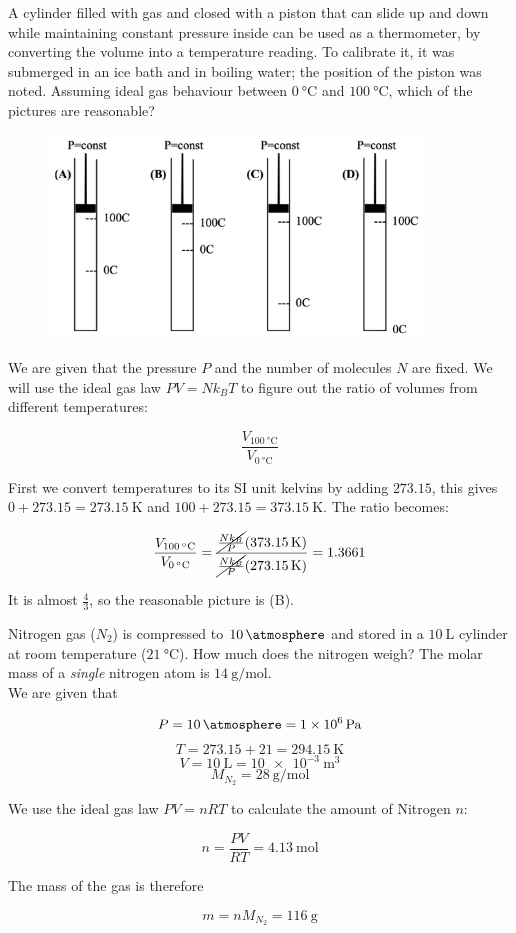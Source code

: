 \documentclass[12pt, a4paper]{article}
\newcounter{exa}
\begin{document}
\begin{texample}
A cylinder filled with gas and closed with a piston that can slide up and down while maintaining constant pressure inside can be used as a thermometer, by converting the volume into a temperature reading. To calibrate it, it was submerged in an ice bath and in boiling water; the position of the piston was 
noted. Assuming ideal gas behaviour between $\SI{0}{\celsius}$ and $\SI{100}{\celsius}$, which of the pictures are reasonable?

\begin{figure}[H]
\centering
\includegraphics[width=100mm]{18.png}
\end{figure}

We are given that the pressure $P$ and the number of molecules $N$ are fixed. We will use the ideal gas law $PV=Nk_B T$ to figure out the ratio of volumes from different temperatures:

$$\frac{V_{\SI{100}{\celsius}}}{V_{\SI{0}{\celsius}}}$$

First we convert temperatures to its SI unit kelvins by adding $273.15$, this gives $0+273.15=\SI{273.15}{\kelvin}$ and $100+273.15=\SI{373.15}{\kelvin}$. The ratio becomes:

$$\frac{V_{\SI{100}{\celsius}}}{V_{\SI{0}{\celsius}}}=\frac{\cancel{\frac{Nk_B}{P}} (\SI{373.15}{\kelvin})}{\cancel{\frac{Nk_B}{P}} (\SI{273.15}{\kelvin})}=1.3661$$

It is almost $\frac43$, so the reasonable picture is (B).
\end{texample}

\begin{texample}
Nitrogen gas ($N_2$) is compressed to $\SI{10}{\atmosphere}$ and stored in a $\SI{10}{\liter}$ cylinder at room temperature ($\SI{21}{\celsius}$). How much does the nitrogen weigh? The molar mass of a \textit{single} nitrogen atom is $\SI{14}{\gram\per\mole}$. \\

We are given that

$$P=\SI{10}{\atmosphere}=\SI{1e6}{\pascal}$$
$$T=273.15+21=\SI{294.15}{\kelvin}$$
$$V=\SI{10}{\liter}=\SI{10e-3}{\cubic\meter}$$
$$M_{N_2}=\SI{28}{\gram\per\mole}$$

We use the ideal gas law $PV=nRT$ to calculate the amount of Nitrogen $n$:

$$n=\frac{PV}{RT}=\SI{4.13}{\mole}$$

The mass of the gas is therefore

$$m=nM_{N_2}=\SI{116}{\gram}$$
\end{texample}
\end{document}

